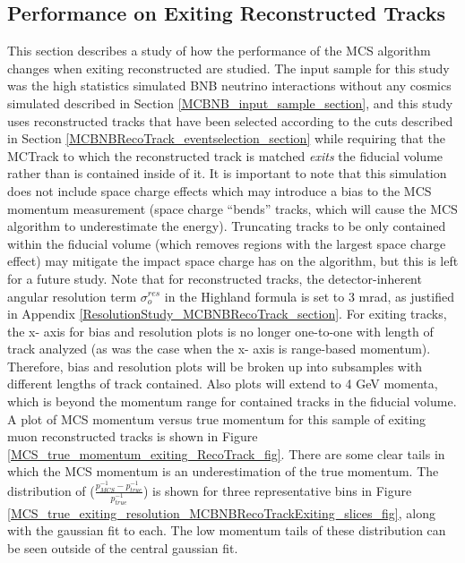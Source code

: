 \subsection{Performance on Exiting Reconstructed Tracks}\label{ExitingStudy_MCBNBRecoTrack_section}
This section describes a study of how the performance of the MCS algorithm changes when exiting reconstructed are studied. The input sample for this study was the high statistics simulated BNB neutrino interactions without any cosmics simulated described in Section \ref{MCBNB_input_sample_section}, and this study uses reconstructed tracks that have been selected according to the cuts described in Section \ref{MCBNBRecoTrack_eventselection_section} while requiring that the {\sc MCTrack} to which the reconstructed track is matched \textit{exits} the fiducial volume rather than is contained inside of it. It is important to note that this simulation does not include space charge effects which may introduce a bias to the MCS momentum measurement (space charge ``bends'' tracks, which will cause the MCS algorithm to underestimate the energy). Truncating tracks to be only contained within the fiducial volume (which removes regions with the largest space charge effect) may mitigate the impact space charge has on the algorithm, but this is left for a future study. Note that for reconstructed tracks, the detector-inherent angular resolution term $\sigma_o^{res}$ in the Highland formula is set to 3 mrad, as justified in Appendix \ref{ResolutionStudy_MCBNBRecoTrack_section}. For exiting tracks, the x- axis for bias and resolution plots is no longer one-to-one with length of track analyzed (as was the case when the x- axis is range-based momentum). Therefore, bias and resolution plots will be broken up into subsamples with different lengths of track contained. Also plots will extend to 4 GeV momenta, which is beyond the momentum range for contained tracks in the fiducial volume.\\

A plot of MCS momentum versus true momentum for this sample of exiting muon reconstructed tracks is shown in Figure \ref{MCS_true_momentum_exiting_RecoTrack_fig}. There are some clear tails in which the MCS momentum is an underestimation of the true momentum. The distribution of ($\frac{p_{MCS}^{-1} - p_{true}^{-1}}{p_{true}^{-1}}$) is shown for three representative bins in Figure \ref{MCS_true_exiting_resolution_MCBNBRecoTrackExiting_slices_fig}, along with the gaussian fit to each. The low momentum tails of these distribution can be seen outside of the central gaussian fit.\\

